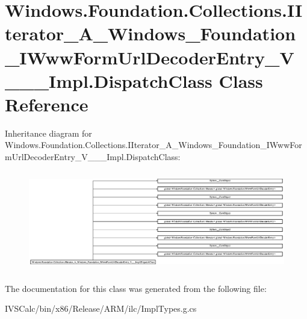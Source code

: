 \hypertarget{class_windows_1_1_foundation_1_1_collections_1_1_i_iterator___a___windows___foundation___i_www_fb4fec745f5645fc006124c2f37d9c1c7}{}\section{Windows.\+Foundation.\+Collections.\+I\+Iterator\+\_\+\+A\+\_\+\+Windows\+\_\+\+Foundation\+\_\+\+I\+Www\+Form\+Url\+Decoder\+Entry\+\_\+\+V\+\_\+\+\_\+\+\_\+\+Impl.\+Dispatch\+Class Class Reference}
\label{class_windows_1_1_foundation_1_1_collections_1_1_i_iterator___a___windows___foundation___i_www_fb4fec745f5645fc006124c2f37d9c1c7}
Inheritance diagram for Windows.\+Foundation.\+Collections.\+I\+Iterator\+\_\+\+A\+\_\+\+Windows\+\_\+\+Foundation\+\_\+\+I\+Www\+Form\+Url\+Decoder\+Entry\+\_\+\+V\+\_\+\+\_\+\+\_\+\+Impl.\+Dispatch\+Class\+:\begin{figure}[H]
\begin{center}
\leavevmode
\includegraphics[height=4.406295cm]{class_windows_1_1_foundation_1_1_collections_1_1_i_iterator___a___windows___foundation___i_www_fb4fec745f5645fc006124c2f37d9c1c7}
\end{center}
\end{figure}


The documentation for this class was generated from the following file\+:\begin{DoxyCompactItemize}
\item 
I\+V\+S\+Calc/bin/x86/\+Release/\+A\+R\+M/ilc/Impl\+Types.\+g.\+cs\end{DoxyCompactItemize}

